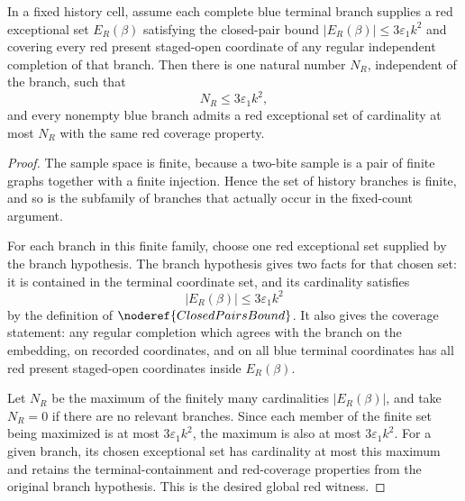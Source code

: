 \begin{helper}
In a fixed history cell, assume each complete blue terminal branch supplies a
red exceptional set \(E_R(\beta)\) satisfying the closed-pair bound
\(|E_R(\beta)|\le 3\varepsilon_1 k^2\) and covering every red present
staged-open coordinate of any regular independent completion of that branch.
Then there is one natural number \(N_R\), independent of the branch, such that
\[
N_R\le 3\varepsilon_1 k^2,
\]
and every nonempty blue branch admits a red exceptional set of cardinality at
most \(N_R\) with the same red coverage property.
\end{helper}
\begin{proof}
The sample space is finite, because a two-bite sample is a pair of finite
graphs together with a finite injection.  Hence the set of history branches is
finite, and so is the subfamily of branches that actually occur in the
fixed-count argument.

For each branch in this finite family, choose one red exceptional set supplied
by the branch hypothesis.  The branch hypothesis gives two facts for that
chosen set: it is contained in the terminal coordinate set, and its
cardinality satisfies
\[
|E_R(\beta)|\le 3\varepsilon_1 k^2
\]
by the definition of \(\noderef{ClosedPairsBound}\).  It also gives the
coverage statement: any regular completion which agrees with the branch on
the embedding, on recorded coordinates, and on all blue terminal coordinates
has all red present staged-open coordinates inside \(E_R(\beta)\).

Let \(N_R\) be the maximum of the finitely many cardinalities
\(|E_R(\beta)|\), and take \(N_R=0\) if there are no relevant branches.  Since
each member of the finite set being maximized is at most
\(3\varepsilon_1 k^2\), the maximum is also at most
\(3\varepsilon_1 k^2\).  For a given branch, its chosen exceptional set has
cardinality at most this maximum and retains the terminal-containment and
red-coverage properties from the original branch hypothesis.  This is the
desired global red witness.
\end{proof}
